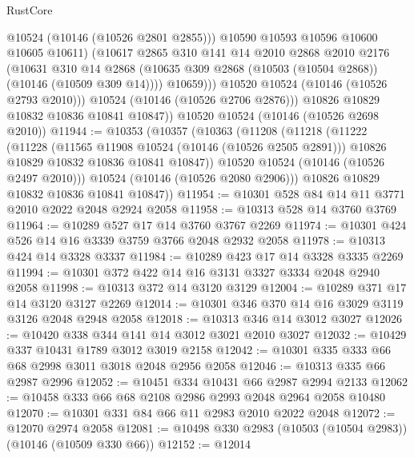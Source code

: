 \begin{lexlean}{RustCore}
\begin{coremodule}
                    @10524
                    (@10146 (@10526 @2801 @2855)))
                  @10590
                  @10593
                  @10596
                  @10600
                  @10605
                  @10611)
                (@10617
                  @2865
                  @310
                  @141
                  @14
                  @2010
                  @2868
                  @2010
                  @2176
                  (@10631
                    @310
                    @14
                    @2868
                    (@10635 @309 @2868 (@10503 (@10504 @2868)) (@10146 (@10509 @309 @14))))
                  @10659)))
            @10520
            @10524
            (@10146 (@10526 @2793 @2010)))
          @10524
          (@10146 (@10526 @2706 @2876)))
        @10826
        @10829
        @10832
        @10836
        @10841
        @10847))
    @10520
    @10524
    (@10146 (@10526 @2698 @2010))
@11944 := @10353
    (@10357
      (@10363
        (@11208
          (@11218
            (@11222
              (@11228
                (@11565 @11908 @10524 (@10146 (@10526 @2505 @2891)))
                @10826
                @10829
                @10832
                @10836
                @10841
                @10847))
            @10520
            @10524
            (@10146 (@10526 @2497 @2010)))
          @10524
          (@10146 (@10526 @2080 @2906)))
        @10826
        @10829
        @10832
        @10836
        @10841
        @10847))
@11954 := @10301 @528 @84 @14 @11 @3771 @2010 @2022 @2048 @2924 @2058
@11958 := @10313 @528 @14 @3760 @3769
@11964 := @10289 @527 @17 @14 @3760 @3767 @2269
@11974 := @10301 @424 @526 @14 @16 @3339 @3759 @3766 @2048 @2932 @2058
@11978 := @10313 @424 @14 @3328 @3337
@11984 := @10289 @423 @17 @14 @3328 @3335 @2269
@11994 := @10301 @372 @422 @14 @16 @3131 @3327 @3334 @2048 @2940 @2058
@11998 := @10313 @372 @14 @3120 @3129
@12004 := @10289 @371 @17 @14 @3120 @3127 @2269
@12014 := @10301 @346 @370 @14 @16 @3029 @3119 @3126 @2048 @2948 @2058
@12018 := @10313 @346 @14 @3012 @3027
@12026 := @10420 @338 @344 @141 @14 @3012 @3021 @2010 @3027
@12032 := @10429 @337 @10431 @1789 @3012 @3019 @2158
@12042 := @10301 @335 @333 @66 @68 @2998 @3011 @3018 @2048 @2956 @2058
@12046 := @10313 @335 @66 @2987 @2996
@12052 := @10451 @334 @10431 @66 @2987 @2994 @2133
@12062 := @10458 @333 @66 @68 @2108 @2986 @2993 @2048 @2964 @2058 @10480
@12070 := @10301 @331 @84 @66 @11 @2983 @2010 @2022 @2048
@12072 := @12070 @2974 @2058
@12081 := @10498 @330 @2983 (@10503 (@10504 @2983)) (@10146 (@10509 @330 @66))
@12152 := @12014

\end{coremodule}
\end{lexlean}
